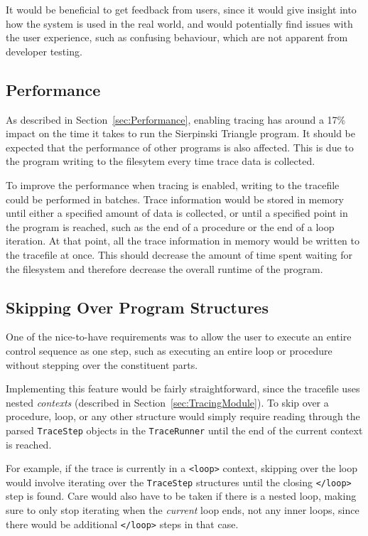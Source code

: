 \documentclass[authoryearcitations]{UoYCSproject}
\begin{document}
It would be beneficial to get feedback from users, since it would give insight into
how the system is used in the real world, and would potentially find issues with the
user experience, such as confusing behaviour, which are not apparent from developer
testing.

\subsection{Performance}
\label{sec:FWPerformance}

As described in Section~\ref{sec:Performance}, enabling tracing has around a 17\%
impact on the time it takes to run the Sierpinski Triangle program. It should be
expected that the performance of other programs is also affected. This is due to
the program writing to the filesytem every time trace data is collected.

To improve the performance when tracing is enabled, writing to the tracefile
could be performed in batches. Trace information would be stored in memory until
either a specified amount of data is collected, or until a specified point in 
the program is reached, such as the end of a procedure or the end of a loop
iteration. At that point, all the trace information in memory would be written
to the tracefile at once. This should decrease the amount of time spent waiting
for the filesystem and therefore decrease the overall runtime of the program.

\subsection{Skipping Over Program Structures}
\label{sec:SkippingOverProgramStructures}

One of the nice-to-have requirements was to allow the user to execute an entire
control sequence as one step, such as executing an entire loop or procedure
without stepping over the constituent parts.

Implementing this feature would be fairly straightforward, since the tracefile
uses nested \emph{contexts} (described in Section~\ref{sec:TracingModule}).
To skip over a procedure, loop, or any other structure would simply require
reading through the parsed \texttt{TraceStep} objects in the \texttt{TraceRunner}
until the end of the current context is reached.

For example, if the trace is currently in a \texttt{<loop>} context, skipping
over the loop would involve iterating over the \texttt{TraceStep} structures
until the closing \texttt{</loop>} step is found. Care would also have to be
taken if there is a nested loop, making sure to only stop iterating when the
\emph{current} loop ends, not any inner loops, since there would be additional
\texttt{</loop>} steps in that case.
\end{document}
